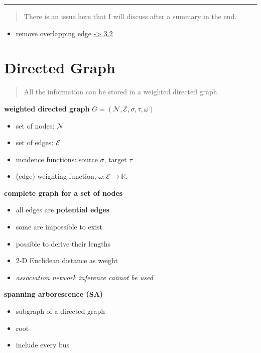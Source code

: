 \documentclass[
]{book}
\providecommand{\tightlist}{%
  \setlength{\itemsep}{0pt}\setlength{\parskip}{0pt}}
\begin{document}
\begin{center}\rule{0.5\linewidth}{0.5pt}\end{center}

\begin{quote}
There is an issue here that I will discuss after a summary in the end.
\end{quote}

\begin{itemize}
\tightlist
\item
  remove overlapping edge \protect\hyperlink{overlapping}{-\textgreater{} 3.2}
\end{itemize}

\hypertarget{directed}{%
\section{Directed Graph}\label{directed}}

\begin{quote}
All the information can be stored in a weighted directed graph.
\end{quote}

\textbf{weighted directed graph}
\(G = (\mathcal{N}, \mathcal{E}, \sigma, \tau, \omega)\)

\begin{itemize}
\tightlist
\item
  set of nodes: \(\mathcal{N}\)
\item
  set of edges: \(\mathcal{E}\)
\item
  incidence functions: source \(\sigma\), target \(\tau\)
\item
  (edge) weighting function, \(\omega: \mathcal{E} \rightarrow \mathbb{R}\).
\end{itemize}

\textbf{complete graph for a set of nodes}

\begin{itemize}
\tightlist
\item
  all edges are \textbf{potential edges}
\item
  some are impossible to exist
\item
  possible to derive their lengths
\item
  2-D Euclidean distance as weight
\item
  \emph{association network inference cannot be used}
\end{itemize}

\textbf{spanning arborescence (SA)}

\begin{itemize}
\tightlist
\item
  subgraph of a directed graph
\item
  root
\item
  include every bus
\end{itemize}
\end{document}
